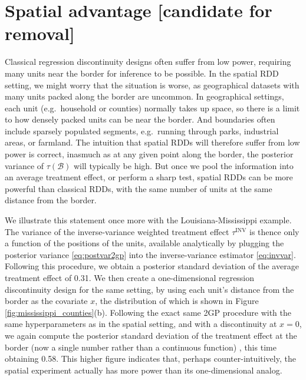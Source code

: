 \documentclass[letter]{article}
\newcommand{\border}{\mathcal{B}}
\newcommand{\invvar}{\tau^{\mathrm{INV}}}
\begin{document}
    	\section{Spatial advantage {[}candidate for removal{]}}\label{spatial-advantage-candidate-for-removal}

Classical regression discontinuity designs often suffer from low power, requiring many units near the border for inference to be possible.
In the spatial RDD setting, we might worry that the situation is worse, as geographical datasets with many units packed along the border are uncommon.
In geographical settings, each unit (e.g.~household or counties) normally takes up space, so there is a limit to how densely packed units can be near the border.
And boundaries often include sparsely populated segments, e.g.~running through parks, industrial areas, or farmland.
The intuition that spatial RDDs will therefore suffer from low power is correct, inasmuch as at any given point along the border, the posterior variance of \(\tau(\border)\) will typically be high.
But once we pool the information into an average treatment effect, or perform a sharp test, spatial RDDs can be more powerful than classical RDDs, with the same number of units at the same distance from the border.

We illustrate this statement once more with the Louisiana-Mississippi example.
The variance of the inverse-variance weighted treatment effect \(\invvar\) is thence only a function of the positions of the units, available analytically by plugging the posterior variance \eqref{eq:postvar2gp} into the inverse-variance estimator \eqref{eq:invvar}.
Following this procedure, we obtain a posterior standard deviation of the average treatment effect of 0.31.
We then create a one-dimensional regression discontinuity design for the same setting, by using each unit's distance from the border as the covariate \(x\), the distribution of which is shown in Figure \ref{fig:mississippi_counties}(b).
Following the exact same 2GP procedure with the same hyperparameters as in the spatial setting, and with a discontinuity at \(x=0\), we again compute the posterior standard deviation of the treatment effect at the border (now a single number rather than a continuous function) , this time obtaining 0.58.
This higher figure indicates that, perhaps counter-intuitively, the spatial experiment actually has more power than its one-dimensional analog.
\end{document}
